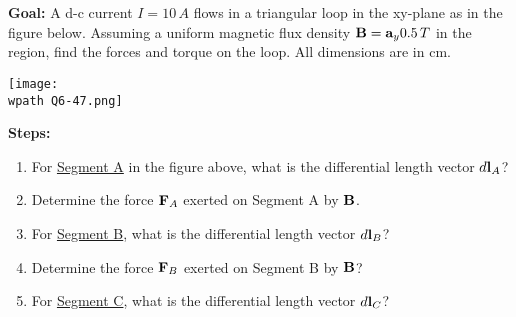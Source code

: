 \documentclass[../../header.tex]{subfiles}
\begin{document}
\textbf{Goal:} A d-c current $I = 10\,A $ flows in a triangular loop in the xy-plane as in the figure below. Assuming a uniform magnetic flux density $\mathbf{B} = \mathbf{a}_y 0.5\,T$ in the region, find the forces and torque on the loop. All dimensions are in {cm}.
\begin{center}
\texttt{[image: \\wpath Q6-47.png]}
\end{center}
\textbf{Steps:} 
\begin{enumerate}
\item For \underline{Segment A} in the figure above, what is the differential length vector $d\textbf{l}_A$?


\item Determine the force $\mathbf{F}_A$ exerted on Segment A by $\mathbf{B}$.


\item For \underline{Segment B}, what is the differential length vector $d\textbf{l}_B$?


\item Determine the force $\mathbf{F}_B$ exerted on Segment B by  $\mathbf{B}$?


\item For \underline{Segment C}, what is the differential length vector $d\textbf{l}_C$?


\end{enumerate}
\end{document}
